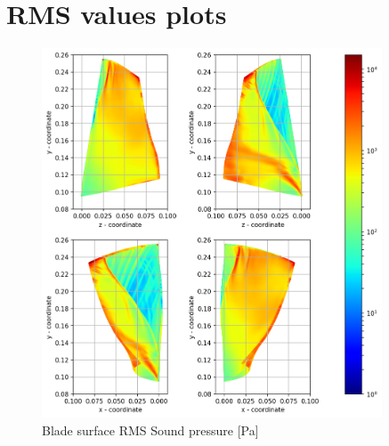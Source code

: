 
\chapter{RMS values plots} %
\label{rms_results} %


\begin{figure}[ht]
    \centering
	\includegraphics[width=0.9\textwidth]{Figures/blade-rms-spl.png}
    \caption{Blade surface RMS Sound pressure [Pa]} \label{blade-rms-spl}
\end{figure}

